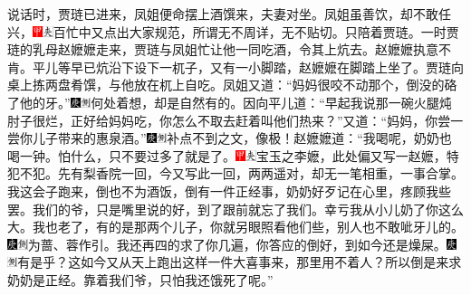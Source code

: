 说话时，贾琏已进来，凤姐便命摆上酒馔来，夫妻对坐。凤姐虽善饮，却不敢任兴，{\includegraphics[width=3mm]{../Images/00002}\includegraphics[width=3mm]{../Images/00012}\footnotesize \kaishu 百忙中又点出大家规范，所谓无不周详，无不贴切。}只陪着贾琏。一时贾琏的乳母赵嬷嬷走来，贾琏与凤姐忙让他一同吃酒，令其上炕去。赵嬷嬷执意不肯。平儿等早已炕沿下设下一杌子，又有一小脚踏，赵嬷嬷在脚踏上坐了。贾琏向桌上拣两盘肴馔，与他放在杌上自吃。凤姐又道：``妈妈很咬不动那个，倒没的硌了他的牙。''{\includegraphics[width=3mm]{../Images/00004}\includegraphics[width=3mm]{../Images/00011}\footnotesize \kaishu 何处着想，却是自然有的。}因向平儿道：``早起我说那一碗火腿炖肘子很烂，正好给妈妈吃，你怎么不取去赶着叫他们热来？''又道：``妈妈，你尝一尝你儿子带来的惠泉酒。''{\includegraphics[width=3mm]{../Images/00004}\includegraphics[width=3mm]{../Images/00011}\footnotesize \kaishu 补点不到之文，像极！}赵嬷嬷道：``我喝呢，奶奶也喝一钟。怕什么，只不要过多了就是了。{\includegraphics[width=3mm]{../Images/00002}\includegraphics[width=3mm]{../Images/00012}\footnotesize \kaishu 宝玉之李嬷，此处偏又写一赵嬷，特犯不犯。先有梨香院一回，今又写此一回，两两遥对，却无一笔相重，一事合掌。}我这会子跑来，倒也不为酒饭，倒有一件正经事，奶奶好歹记在心里，疼顾我些罢。我们的爷，只是嘴里说的好，到了跟前就忘了我们。幸亏我从小儿奶了你这么大。我也老了，有的是那两个儿子，你就另眼照看他们些，别人也不敢呲牙儿的。{\includegraphics[width=3mm]{../Images/00004}\includegraphics[width=3mm]{../Images/00011}\footnotesize \kaishu 为蔷、蓉作引。}我还再四的求了你几遍，你答应的倒好，到如今还是燥屎。{\includegraphics[width=3mm]{../Images/00004}\includegraphics[width=3mm]{../Images/00011}\footnotesize \kaishu 有是乎？}这如今又从天上跑出这样一件大喜事来，那里用不着人？所以倒是来求奶奶是正经。靠着我们爷，只怕我还饿死了呢。''

